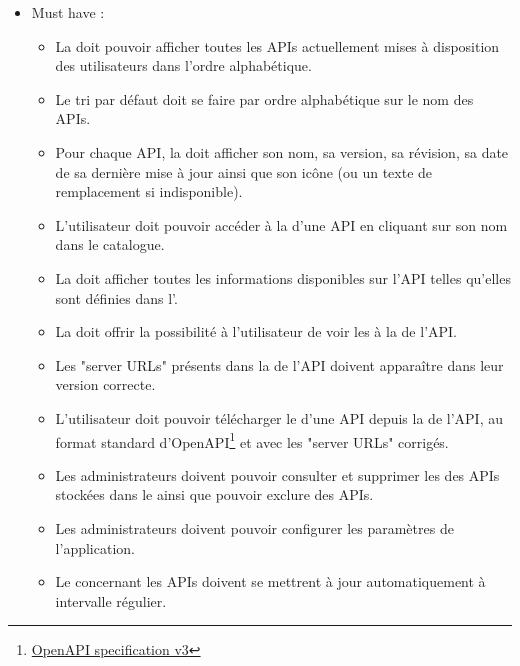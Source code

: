 \begin{itemize}
    \item[$\bullet$] Must have :
    \begin{itemize}
        \item[$\circ$] La  doit pouvoir afficher toutes les APIs actuellement mises à disposition des utilisateurs dans l'ordre alphabétique.
        \item[$\circ$] Le tri par défaut doit se faire par ordre alphabétique sur le nom des APIs.
        \item[$\circ$] Pour chaque API, la  doit afficher son nom, sa version, sa révision, sa date de sa dernière mise à jour ainsi que son icône (ou un texte de remplacement si indisponible).
        \item[$\circ$] L'utilisateur doit pouvoir accéder à la  d'une API en cliquant sur son nom dans le catalogue.
        \item[$\circ$] La  doit afficher toutes les informations disponibles sur l'API telles qu'elles sont définies dans l'.
        \item[$\circ$] La  doit offrir la possibilité à l'utilisateur de voir les  à la  de l'API.
        \item[$\circ$] Les "server URLs" présents dans la  de l'API doivent apparaître dans leur version correcte.
        \item[$\circ$] L'utilisateur doit pouvoir télécharger le  d'une API depuis la  de l'API, au format standard d'OpenAPI\footnote{\href{https://swagger.io/specification/v3/}{OpenAPI specification v3}} et avec les "server URLs" corrigés.
        \item[$\circ$] Les administrateurs doivent pouvoir consulter et supprimer les  des APIs stockées dans le  ainsi que pouvoir exclure des APIs.
        \item[$\circ$] Les administrateurs doivent pouvoir configurer les paramètres de l'application.
        \item[$\circ$] Le  concernant les APIs doivent se mettrent à jour automatiquement à intervalle régulier.

\end{itemize}
\end{itemize}
